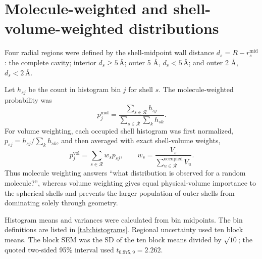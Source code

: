 \documentclass[11pt]{article}
\newcommand{\angstrom}{\text{\AA}}
\begin{document}
\section{Molecule-weighted and shell-volume-weighted distributions}

Four radial regions were defined by the shell-midpoint wall distance
\(d_s=R-r_s^{\mathrm{mid}}\): the complete cavity; interior
\(d_s\geq5\,\angstrom\); outer 5 \(\angstrom\), \(d_s<5\,\angstrom\); and
outer 2 \(\angstrom\), \(d_s<2\,\angstrom\).

Let \(h_{sj}\) be the count in histogram bin \(j\) for shell \(s\).  The
molecule-weighted probability was
\begin{equation}
 p_j^{\mathrm{mol}}=
 \frac{\sum_{s\in\mathcal R}h_{sj}}
 {\sum_{s\in\mathcal R}\sum_k h_{sk}}.
 \label{eq:molecule-weighted}
\end{equation}
For volume weighting, each occupied shell histogram was first normalized,
\(p_{sj}=h_{sj}/\sum_kh_{sk}\), and then averaged with exact shell-volume
weights,
\begin{equation}
 p_j^{\mathrm{vol}}=
 \sum_{s\in\mathcal R}w_s p_{sj},
 \qquad
 w_s=\frac{V_s}{\sum_{u\in\mathcal R}^{\mathrm{occupied}}V_u}.
 \label{eq:volume-weighted}
\end{equation}
Thus molecule weighting answers ``what distribution is observed for a random
molecule?'', whereas volume weighting gives equal physical-volume importance
to the spherical shells and prevents the larger population of outer shells
from dominating solely through geometry.

Histogram means and variances were calculated from bin midpoints.  The bin
definitions are listed in \cref{tab:histograms}.  Regional uncertainty used
ten block means.  The block SEM was the SD of the ten block means divided by
\(\sqrt{10}\); the quoted two-sided 95\% interval used
\(t_{0.975,9}=2.262\).
\end{document}
